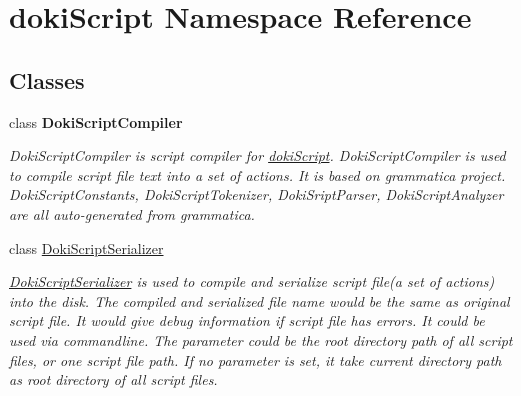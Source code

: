 \hypertarget{namespacedoki_script}{}\section{doki\+Script Namespace Reference}
\label{namespacedoki_script}
\subsection*{Classes}
\begin{DoxyCompactItemize}
\item 
class {\bfseries Doki\+Script\+Compiler}
\begin{DoxyCompactList}\small\item\em Doki\+Script\+Compiler is script compiler for \hyperlink{namespacedoki_script}{doki\+Script}. Doki\+Script\+Compiler is used to compile script file text into a set of actions. It is based on grammatica project. Doki\+Script\+Constants, Doki\+Script\+Tokenizer, Doki\+Sript\+Parser, Doki\+Script\+Analyzer are all auto-\/generated from grammatica. \end{DoxyCompactList}\item 
class \hyperlink{classdoki_script_1_1_doki_script_serializer}{Doki\+Script\+Serializer}
\begin{DoxyCompactList}\small\item\em \hyperlink{classdoki_script_1_1_doki_script_serializer}{Doki\+Script\+Serializer} is used to compile and serialize script file(a set of actions) into the disk. The compiled and serialized file name would be the same as original script file. It would give debug information if script file has errors. It could be used via commandline. The parameter could be the root directory path of all script files, or one script file path. If no parameter is set, it take current directory path as root directory of all script files. \end{DoxyCompactList}\end{DoxyCompactItemize}
